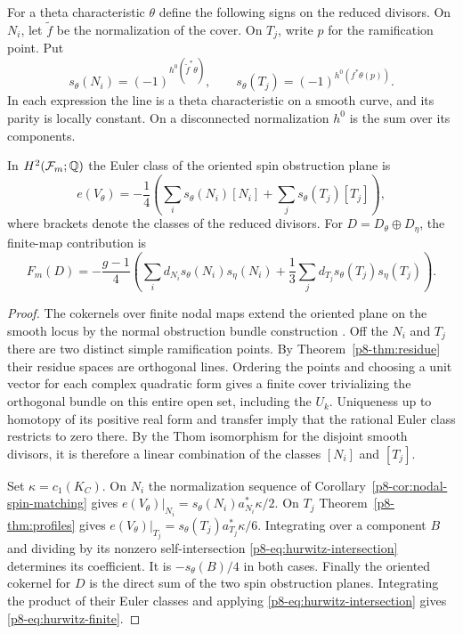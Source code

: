 For a theta characteristic \(\theta\) define the following signs on the
reduced divisors. On \(N_i\), let \(\widetilde f\) be the normalization
of the cover. On \(T_j\), write \(p\) for the ramification point. Put
\begin{equation}\label{p8-eq:hurwitz-signs}
 s_\theta(N_i)=(-1)^{h^0(\widetilde f^*\theta)},\qquad
 s_\theta(T_j)=(-1)^{h^0(f^*\theta(p))}.
\end{equation}
In each expression the line is a theta characteristic on a smooth
curve, and its parity is locally constant. On a disconnected
normalization \(h^0\) is the sum over its components.

\begin{theorem}\label{p8-thm:boundary}
In \(H^2(\mathcal F_m;\mathbb Q)\) the Euler class of the oriented spin
obstruction plane is
\begin{equation}\label{p8-eq:hurwitz-euler}
 e(V_\theta)=-\frac14
    \left(\sum_i s_\theta(N_i)[N_i]+\sum_j s_\theta(T_j)[T_j]\right),
\end{equation}
where brackets denote the classes of the reduced divisors.
For \(D=D_\theta\oplus D_\eta\), the finite-map contribution is
\begin{equation}\label{p8-eq:hurwitz-finite}
 F_m(D)=-\frac{g-1}{4}\left(
    \sum_i d_{N_i}s_\theta(N_i)s_\eta(N_i)
    +\frac13\sum_j d_{T_j}s_\theta(T_j)s_\eta(T_j)\right).
\end{equation}
\end{theorem}

\begin{proof}
The cokernels over finite nodal maps extend the oriented plane on the
smooth locus by the normal obstruction bundle construction
\cite[Theorem~8.1 and Lemma~11.1]{lpob}. Off the \(N_i\) and \(T_j\) there are two
distinct simple ramification points. By Theorem~\ref{p8-thm:residue}
their residue spaces are orthogonal lines. Ordering the points and
choosing a unit vector for each complex quadratic form gives a finite
cover trivializing the orthogonal bundle on this entire open set,
including the \(U_k\). Uniqueness up to homotopy of its positive
real form and transfer imply that the rational Euler class restricts
to zero there. By the Thom isomorphism for the disjoint smooth
divisors, it is therefore a linear combination of the classes
\([N_i]\) and \([T_j]\).

Set \(\kappa=c_1(K_C)\). On \(N_i\) the normalization sequence of
Corollary~\ref{p8-cor:nodal-spin-matching} gives
\(e(V_\theta)|_{N_i}=s_\theta(N_i)a_{N_i}^*\kappa/2\).
On \(T_j\) Theorem~\ref{p8-thm:profiles} gives
\(e(V_\theta)|_{T_j}=s_\theta(T_j)a_{T_j}^*\kappa/6\).
Integrating over a component \(B\) and dividing by its nonzero
self-intersection \eqref{p8-eq:hurwitz-intersection} determines its
coefficient. It is \(-s_\theta(B)/4\) in both cases. Finally the
oriented cokernel for \(D\) is the direct sum of the two spin
obstruction planes. Integrating the product of their Euler classes
and applying \eqref{p8-eq:hurwitz-intersection} gives
\eqref{p8-eq:hurwitz-finite}.
\end{proof}
